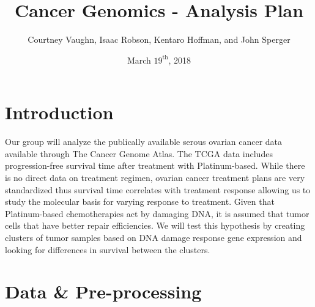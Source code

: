 \documentclass{article}
\author{
Courtney Vaughn, Isaac Robson, Kentaro Hoffman, and John Sperger
}
\title{Cancer Genomics - Analysis Plan}
\date{March $19^{\mathrm{th}}$, 2018}
\begin{document}
\maketitle

\section{Introduction}

  Our group will analyze the publically available serous ovarian cancer data available through The Cancer Genome Atlas. The TCGA data includes progression-free survival time after treatment with Platinum-based. While there is no direct data on treatment regimen, ovarian cancer treatment plans are very standardized thus survival time correlates with treatment response allowing us to study the molecular basis for varying response to treatment. Given that Platinum-based chemotherapies act by damaging DNA, it is assumed that tumor cells that have better repair efficiencies. We will test this hypothesis by creating clusters of tumor samples based on DNA damage response gene expression and looking for differences in survival between the clusters.  
  

\section{Data \& Pre-processing}

\end{document}
